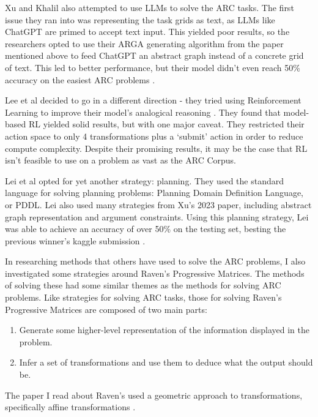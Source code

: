 \documentclass[letterpaper]{article} %
\begin{document}
Xu and Khalil also attempted to use LLMs to solve the ARC tasks. The first issue they ran into was representing the task grids as text, as LLMs like ChatGPT are primed to accept text input. This yielded poor results, so the researchers opted to use their ARGA generating algorithm from the paper mentioned above to feed ChatGPT an abstract graph instead of a concrete grid of text. This led to better performance, but their model didn't even reach 50\% accuracy on the easiest ARC problems \cite{xu2024llmsabstractionreasoningcorpus}.

\bigskip

Lee et al decided to go in a different direction - they tried using Reinforcement Learning to improve their model's analogical reasoning \cite{lee2024enhancinganalogicalreasoningabstraction}. They found that model-based RL yielded solid results, but with one major caveat. They restricted their action space to only 4 transformations plus a `submit' action in order to reduce compute complexity. Despite their promising results, it may be the case that RL isn't feasible to use on a problem as vast as the ARC Corpus.

\bigskip

Lei et al opted for yet another strategy: planning. They used the standard language for solving planning problems: Planning Domain Definition Language, or PDDL. Lei also used many strategies from Xu's 2023 paper, including abstract graph representation and argument constraints. Using this planning strategy, Lei was able to achieve an accuracy of over 50\% on the testing set, besting the previous winner's kaggle submission \cite{Lei_Lipovetzky_Ehinger_2024}.

\bigskip

In researching methods that others have used to solve the ARC problems, I also investigated some strategies around Raven's Progressive Matrices. The methods of solving these had some similar themes as the methods for solving ARC problems. Like strategies for solving ARC tasks, those for solving Raven's Progressive Matrices are composed of two main parts:
\begin{enumerate}
    \item Generate some higher-level representation of the information displayed in the problem.
    \item Infer a set of transformations and use them to deduce what the output should be.
\end{enumerate}
The paper I read about Raven's used a geometric approach to transformations, specifically affine transformations \cite{KUNDA201347}.
\end{document}
